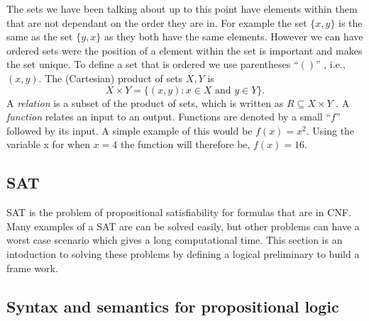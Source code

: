 \documentclass[11pt,a4paper]{article}
\begin{document}
The sets we have been talking about up to this point have elements within them that are not dependant on the order they are in. For example the set $\{x,y\}$ is the same as the set $\{y, x\}$ as they both have the same elements. However we can have ordered sets were the position of a element within the set is important and makes the set unique. To define a set that is ordered we use parentheses  ``$()$'' , i.e., $(x,y)$. 
The (Cartesian) product of sets $X, Y$ is
\begin{displaymath}
  X \times Y = \{(x,y) : x \in X \text{ and } y \in Y\}.
\end{displaymath}
A \emph{relation} is a subset of the product of sets, which is written as $R \subseteq X \times Y$ \cite{Marek2009Introduction}. A \emph{function} relates an input to an output. Functions are denoted by a small ``$f$'' followed by its input. A simple example of this would be $f(x) = x^2$. Using the variable x for when $x=4$ the function will therefore be, $f(x) = 16$.



\subsection{SAT}
\label{sec:SAT}

SAT is the problem of propositional satisfiability for formulas that are in CNF. Many examples of a SAT are can be solved easily, but other problems can have a worst case scenario which gives a long computational time. This section is an intoduction to solving these problems by defining a logical preliminary to build a frame work.

\subsection{Syntax and semantics for propositional logic}
\label{sec:syntaxsem}
\end{document}
